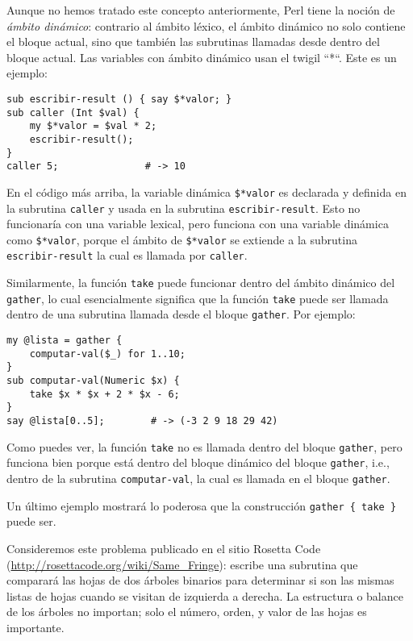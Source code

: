 Aunque no hemos tratado este concepto anteriormente,
Perl tiene la noción de \emph{ámbito dinámico}: contrario
al ámbito léxico, el ámbito dinámico no solo contiene el bloque
actual, sino que también las subrutinas llamadas desde dentro 
del bloque actual. Las variables con ámbito dinámico usan
el twigil ``*``. Este es un ejemplo:
%
\begin{verbatim}
sub escribir-result () { say $*valor; }
sub caller (Int $val) { 
    my $*valor = $val * 2; 
    escribir-result();
}
caller 5;               # -> 10
\end{verbatim}
%
En el código más arriba, la variable dinámica \verb|$*valor| es
declarada y definida en la subrutina \verb|caller| y usada en la
subrutina \verb|escribir-result|. Esto no funcionaría con una variable
lexical, pero funciona con una variable dinámica como \verb|$*valor|,
porque el ámbito de \verb|$*valor| se extiende a la subrutina \verb|escribir-result|
la cual es llamada por \verb|caller|.

Similarmente, la función {\tt take} puede funcionar dentro del ámbito dinámico del
\verb|gather|, lo cual esencialmente significa que la función {\tt take} 
puede ser llamada dentro de una subrutina llamada desde el bloque 
\verb|gather|. Por ejemplo:

\begin{verbatim}
my @lista = gather {
    computar-val($_) for 1..10; 
}
sub computar-val(Numeric $x) {
    take $x * $x + 2 * $x - 6;
}
say @lista[0..5];        # -> (-3 2 9 18 29 42)
\end{verbatim}

Como puedes ver, la función {\tt take} no es llamada dentro del
bloque {\tt gather}, pero funciona bien porque está dentro 
del bloque dinámico del bloque {\tt gather}, i.e., dentro de la
subrutina {\tt computar-val}, la cual es llamada en el bloque 
{\tt gather}.

Un último ejemplo mostrará lo poderosa que la construcción 
\verb|gather { take }| puede ser.

Consideremos este problema publicado en el sitio Rosetta Code
(\url{http://rosettacode.org/wiki/Same_Fringe}): 
escribe una subrutina que comparará las hojas de dos árboles
binarios para determinar si son las mismas listas de hojas cuando
se visitan de izquierda a derecha. La estructura o balance de los 
árboles no importan; solo el número, orden, y valor de las hojas
es importante.

